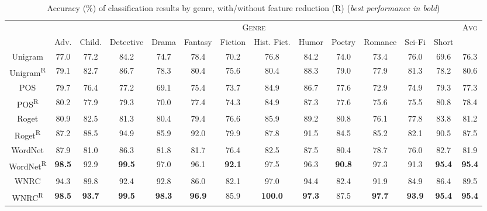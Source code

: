 \begin{table*}[!t]
    \caption{Accuracy (\%) of classification results by genre, with/without feature reduction (R) (\textit{best performance in bold})}
    \label{tab:results by genre}
    \begin{tabular}{c|cccccccccccc|c}
        \hline
        \centering
        \multirow{2}{*}{\textsc{Model}} & \multicolumn{12}{|c|}{\textsc{Genre}} & \multirow{2}{*}{\textsc{Avg}} \\
        \cline{2-13}
        & Adv. & Child. & Detective & Drama & Fantasy & Fiction & Hist. Fict. & Humor & Poetry & Romance & Sci-Fi & Short & \\
        \hline
        Unigram & 77.0 & 77.2 & 84.2 & 74.7 & 78.4 & 70.2 & 76.8 & 84.2 & 74.0 & 73.4 & 76.0 & 69.6 & 76.3 \\
        Unigram\textsuperscript{R} & 79.1 & 82.7 & 86.7 & 78.3 & 80.4 & 75.6 & 80.4 & 88.3 & 79.0 & 77.9 & 81.3 & 78.2 & 80.6 \\
        \hline
        POS & 79.7 & 76.4 & 77.2 & 69.1 & 75.4 & 73.7 & 84.9 & 86.7 & 77.6 & 72.9 & 74.9 & 79.3 & 77.3 \\
        POS\textsuperscript{R} & 80.2 & 77.9 & 79.3 & 70.0 & 77.4 & 74.3 & 84.9 & 87.3 & 77.6 & 75.6 & 75.5 & 80.8 & 78.4 \\
        \hline
        Roget & 80.9 & 82.5 & 81.3 & 80.4 & 79.4 & 76.6 & 85.9 & 89.2 & 80.8 & 76.1 & 77.8 & 83.8 & 81.2 \\
        Roget\textsuperscript{R} & 87.2 & 88.5 & 94.9 & 85.9 & 92.0 & 79.9 & 87.8 & 91.5 & 84.5 & 85.2 & 82.1 & 90.5 & 87.5 \\
        \hline
        WordNet & 87.9 & 81.0 & 86.3 & 81.8 & 81.7 & 76.4 & 82.5 & 87.5 & 80.4 & 78.7 & 76.0 & 82.7 & 81.9 \\
        WordNet\textsuperscript{R} & \textbf{98.5} & 92.9 & \textbf{99.5} & 97.0 & 96.1 & \textbf{92.1} & 97.5 & 96.3 & \textbf{90.8} & 97.3 & 91.3 & \textbf{95.4} & \textbf{95.4} \\
        \hline
        WNRC & 94.3 & 89.8 & 92.4 & 92.8 & 86.0 & 82.1 & 97.0 & 94.4 & 82.4 & 91.9 & 84.9 & 86.4 & 89.5 \\
        WNRC\textsuperscript{R} & \textbf{98.5} & \textbf{93.7} & \textbf{99.5} & \textbf{98.3} & \textbf{96.9} & 85.9 & \textbf{100.0} & \textbf{97.3} & 87.5 & \textbf{97.7} & \textbf{93.9} & \textbf{95.4} & \textbf{95.4} \\

\end{tabular}
\end{table*}
